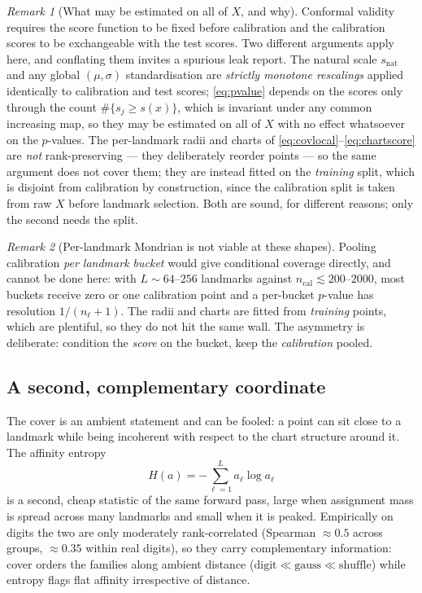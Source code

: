 \documentclass[12pt]{iopart}
\theoremstyle{definition}
\theoremstyle{plain}
\theoremstyle{remark}
\newtheorem{remark}{Remark}
\begin{document}
\begin{remark}[What may be estimated on all of $X$, and why]
\label{rem:validity}
Conformal validity requires the score function to be fixed before calibration
and the calibration scores to be exchangeable with the test scores. Two
different arguments apply here, and conflating them invites a spurious leak
report. The natural scale $s_{\mathrm{nat}}$ and any global $(\mu,\sigma)$
standardisation are \emph{strictly monotone rescalings} applied identically to
calibration and test scores; \eqref{eq:pvalue} depends on the scores only
through the count $\#\{s_j\ge s(x)\}$, which is invariant under any common
increasing map, so they may be estimated on all of $X$ with no effect
whatsoever on the $p$-values. The per-landmark radii and charts of
\eqref{eq:covlocal}--\eqref{eq:chartscore} are \emph{not} rank-preserving ---
they deliberately reorder points --- so the same argument does not cover them;
they are instead fitted on the \emph{training} split, which is disjoint from
calibration by construction, since the calibration split is taken from raw $X$
before landmark selection. Both are sound, for different reasons; only the
second needs the split.
\end{remark}

\begin{remark}[Per-landmark Mondrian is not viable at these shapes]
\label{rem:mondrianbucket}
Pooling calibration \emph{per landmark bucket} would give conditional coverage
directly, and cannot be done here: with $L\sim 64$--$256$ landmarks against
$n_{\mathrm{cal}}\lesssim 200$--$2000$, most buckets receive zero or one
calibration point and a per-bucket $p$-value has resolution $1/(n_\ell+1)$. The
radii and charts are fitted from \emph{training} points, which are plentiful,
so they do not hit the same wall. The asymmetry is deliberate: condition the
\emph{score} on the bucket, keep the \emph{calibration} pooled.
\end{remark}

\subsection{A second, complementary coordinate}
\label{sec:entropy}

The cover is an ambient statement and can be fooled: a point can sit close to a
landmark while being incoherent with respect to the chart structure around it.
The affinity entropy
\begin{equation}
\label{eq:aent}
H(a)=-\sum_{\ell=1}^{L}a_\ell\log a_\ell
\end{equation}
is a second, cheap statistic of the same forward pass, large when assignment
mass is spread across many landmarks and small when it is peaked. Empirically
on digits the two are only moderately rank-correlated (Spearman $\approx 0.5$
across groups, $\approx 0.35$ within real digits), so they carry complementary
information: cover orders the families along ambient distance
($\mathrm{digit}\ll\mathrm{gauss}\ll\mathrm{shuffle}$) while entropy flags flat
affinity irrespective of distance.
\end{document}
